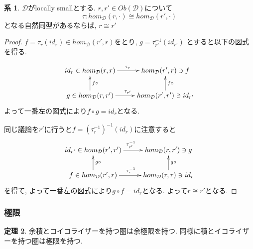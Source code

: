 \documentclass[dvipdfmx,a4paper,11pt]{article}
\theoremstyle{definition}
\newtheorem{thm}{定理}
\newtheorem{cor}[thm]{系}
\begin{document}
 \begin{tcolorbox}
 [colback = white, colframe = green!35!black, fonttitle = \bfseries,breakable = true]
\begin{cor}
\label{cor-yoneda}
$\mathcal{D} $がlocally smallとする. $r, r' \in Ob(\mathcal{D})$について
$$
\tau : hom_{\mathcal{D}}(r, \cdot) \cong hom_{\mathcal{D}}(r', \cdot)
$$
となる自然同型があるならば, $r \cong r'$
\end{cor}
\end{tcolorbox}
\begin{proof}
$f = \tau_{r}(id_r) \in hom_{\mathcal{D}}(r',r)$をとり, 
$g = \tau_{r'}^{-1}(id_{r'})$
とすると以下の図式を得る.

\begin{equation*}
\xymatrix@C=25pt@R=20pt{
id_r \in hom_{\mathcal{D}}(r,r) \ar@{->}[r]^{\tau_{r}}
& hom_{\mathcal{D}}(r',r) \ni f\\
g \in hom_{\mathcal{D}}(r,r') \ar@{->}[r]^{\tau_{r'}} \ar@{->}[u]_{f \circ }
& hom_{\mathcal{D}}(r',r') \ar@{->}[u]_{f \circ } \ni id_{r'}\\   
}
\end{equation*}
よって一番左の図式により$f \circ g = id_{r}$となる.

同じ議論を$r'$に行うと$f = (\tau_{r}^{-1})^{-1}(id_r)$に注意すると
\begin{equation*}
\xymatrix@C=25pt@R=20pt{
id_{r'} \in hom_{\mathcal{D}}(r',r') \ar@{->}[r]^{\tau_{r'}^{-1}}
& hom_{\mathcal{D}}(r,r') \ni g\\
f \in hom_{\mathcal{D}}(r',r) \ar@{->}[r]^{\tau_{r}^{-1}} \ar@{->}[u]_{g\circ }
& hom_{\mathcal{D}}(r,r) \ar@{->}[u]_{g \circ } \ni id_{r}\\   
}
\end{equation*}
を得て, よって一番左の図式により$g \circ f= id_{r}$となる.
よって$r \cong r'$となる. 
\end{proof}

\subsubsection{極限}
 
 \begin{tcolorbox}
 [colback = white, colframe = green!35!black, fonttitle = \bfseries,breakable = true]
\begin{thm}
\label{thm-eq-pro}
余積とコイコライザーを持つ圏は余極限を持つ. 
同様に積とイコライザーを持つ圏は極限を持つ. 
\end{thm}
\end{tcolorbox}
\end{document}
